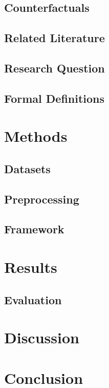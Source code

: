 \documentclass[12pt,a4paper]{report}
\begin{document}
\section{Counterfactuals}
\label{sec:counterfactuals}



\section{Related Literature}
\label{sec:literature}



\section{Research Question}
\label{sec:rq}


\section{Formal Definitions}
\label{sec:formulas}








\chapter{Methods}
\label{sec:methods}

\section{Datasets}
\label{sec:datasets}

\section{Preprocessing}
\label{sec:preprocessing}

\section{Framework}

\chapter{Results}
\label{sec:results}

\section{Evaluation}
\label{subsec:evaluation}


\chapter{Discussion}
\label{sec:dicussion}


\chapter{Conclusion}
\label{sec:conclusion}


\printbibliography

\appendix
\end{document}
